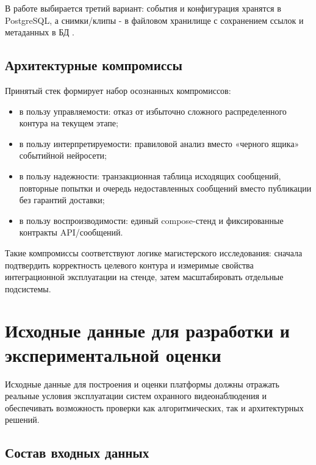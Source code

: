 В работе выбирается третий вариант: события и конфигурация хранятся в PostgreSQL, а снимки/клипы - в файловом хранилище с сохранением ссылок и метаданных в БД \cite{postgresql_docs}.

\subsection{Архитектурные компромиссы}

Принятый стек формирует набор осознанных компромиссов:
\begin{itemize}
    \item в пользу управляемости: отказ от избыточно сложного распределенного контура на текущем этапе;
    \item в пользу интерпретируемости: правиловой анализ вместо «черного ящика» событийной нейросети;
    \item в пользу надежности: транзакционная таблица исходящих сообщений, повторные попытки и очередь недоставленных сообщений вместо публикации без гарантий доставки;
    \item в пользу воспроизводимости: единый compose-стенд и фиксированные контракты API/сообщений.
\end{itemize}

Такие компромиссы соответствуют логике магистерского исследования: сначала подтвердить корректность целевого контура и измеримые свойства интеграционной эксплуатации на стенде, затем масштабировать отдельные подсистемы.

\section{Исходные данные для разработки и экспериментальной оценки}

Исходные данные для построения и оценки платформы должны отражать реальные условия эксплуатации систем охранного видеонаблюдения и обеспечивать возможность проверки как алгоритмических, так и архитектурных решений.

\subsection{Состав входных данных}

